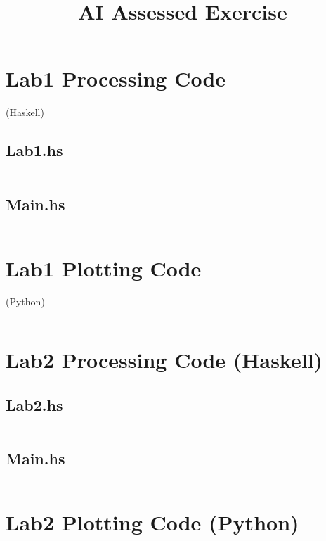 \documentclass[a4paper]{article}
\begin{document}
\title{AI Assessed Exercise}

\author{
}


\appendix

\section{Lab1 Processing Code} (Haskell)

\subsection{Lab1.hs}
\inputminted{haskell}{../src/AI/Lab1/Lab1.hs}

\subsection{Main.hs}
\inputminted{haskell}{../src/AI/Lab1/Main.hs}

\section{Lab1 Plotting Code} (Python)
\inputminted{python}{../src/AI/Lab1/plotting.py}


\section{Lab2 Processing Code (Haskell)}

\subsection{Lab2.hs}
\inputminted{haskell}{../src/AI/Lab2/Lab2.hs}

\subsection{Main.hs}
\inputminted{haskell}{../src/AI/Lab2/Main.hs}


\section{Lab2 Plotting Code (Python)}
\inputminted{python}{../src/AI/Lab2/plotting.py}
\end{document}
